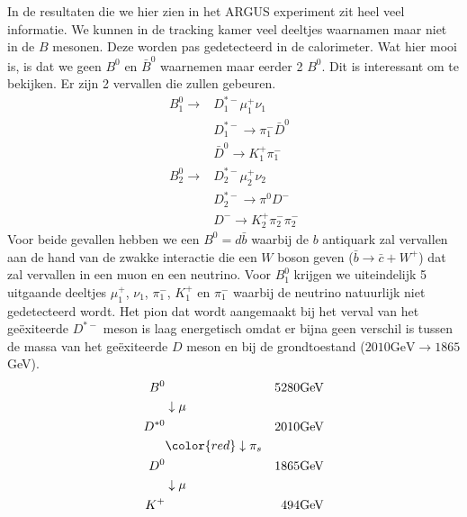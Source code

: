 \documentclass[../main.tex]{subfiles}
\begin{document}
In de resultaten die we hier zien in het ARGUS experiment zit heel veel informatie. We kunnen in de tracking kamer veel deeltjes waarnamen maar niet in de $B$ mesonen. Deze worden pas gedetecteerd in de calorimeter. Wat hier mooi is, is dat we geen $B^0$ en $\bar{B}^0$ waarnemen maar eerder 2 $B^0$. Dit is interessant om te bekijken. Er zijn 2 vervallen die zullen gebeuren.
\begin{equation}
    \begin{aligned}
        \label{eq:argus_vervallen}
        B_{1}^{0} \rightarrow & D_{1}^{*-} \mu_{1}^{+} \nu_{1} \\
                              & D_{1}^{*-} \rightarrow \pi_{1}^{-} \bar{D}^{0} \\
                              & \bar{D}^{0} \rightarrow K_{1}^{+} \pi_{1}^{-} \\
        B_{2}^{0} \rightarrow & D_{2}^{*-} \mu_{2}^{+} \nu_{2} \\
                              & D_{2}^{*-} \rightarrow \pi^{0} D^{-} \\
                              & D^{-} \rightarrow K_{2}^{+} \pi_{2}^{-} \pi_{2}^{-}
    \end{aligned}
\end{equation}
Voor beide gevallen hebben we een $B^0=d\bar{b}$ waarbij de $b$ antiquark zal vervallen aan de hand van de zwakke interactie die een $W$ boson geven ($\bar{b} \rightarrow \bar{c}+W^{+}$) dat zal vervallen in een muon en een neutrino. Voor $B_1^0$ krijgen we uiteindelijk 5 uitgaande deeltjes $\mu_1^+$, $\nu_1$, $\pi_1^-$, $K_1^+$ en $\pi_1^-$ waarbij de neutrino natuurlijk niet gedetecteerd wordt. Het pion dat wordt aangemaakt bij het verval van het geëxiteerde $D^{*-}$ meson is laag energetisch omdat er bijna geen verschil is tussen de massa van het geëxiteerde $D$ meson en bij de grondtoestand ($2010\text{GeV}\rightarrow1865$GeV).
\begin{equation}
    \begin{aligned}
        \label{eq:argus_verval_1}
        B^0     &                   & 5280\text{GeV}    \\
                & \downarrow \mu    &                   \\
        D^{*0}  &                   & 2010\text{GeV}    \\
                & {\color{red} \downarrow \pi_s}    &   \\
        D^0     &                   & 1865\text{GeV}    \\
                & \downarrow \mu    &                   \\
        K^+     &                   & 494\text{GeV}     \\
    \end{aligned}
\end{equation}
\end{document}
